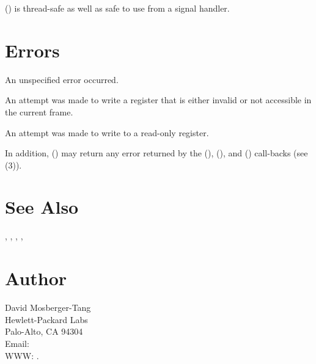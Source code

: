 \documentclass{article}
\begin{document}
() is thread-safe as well as safe to use
from a signal handler.

\section{Errors}

\begin{Description}
\item[\Const{UNW\_EUNSPEC}] An unspecified error occurred.
\item[\Const{UNW\_EBADREG}] An attempt was made to write a register
  that is either invalid or not accessible in the current frame.
\item[\Const{UNW\_EREADONLY}] An attempt was made to write to a
  read-only register.
\end{Description}
In addition, () may return any error returned by
the (), (), and
() call-backs (see
(3)).

\section{See Also}

,
,
,
,

\section{Author}

\noindent
David Mosberger-Tang\\
Hewlett-Packard Labs\\
Palo-Alto, CA 94304\\
Email: \\
WWW: .
\LatexManEnd
\end{document}
